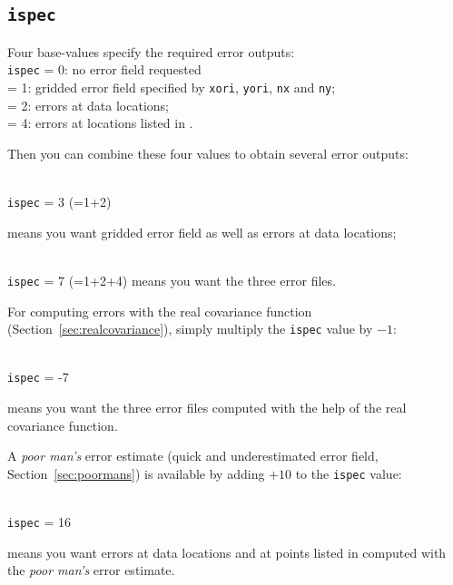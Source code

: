                       
\subsection{\texttt{ispec}}

Four base-values specify the required error outputs:\\

\texttt{ispec}       = 0\qquad: no error field requested\\
  = 1\qquad: gridded error field specified by \texttt{xori}, \texttt{yori}, \texttt{nx} and \texttt{ny}; \\
  = 2\qquad: errors at data locations;\\
  = 4\qquad: errors at locations listed in .

Then you can combine these four values to obtain several error outputs:

\examples\\
\texttt{ispec}             = 3 (=1+2)\hphantom{+4} \qquad \begin{minipage}[t]{.7\textwidth}means you want gridded error field as well as errors at data locations;\end{minipage}\\ 
\texttt{ispec}             = 7 (=1+2+4) \qquad means you want the three error files.


For computing errors with the real covariance function (Section~\ref{sec:realcovariance}), simply multiply the \texttt{ispec} value by $-1$:

\example\\
\texttt{ispec}             = -7 \qquad \begin{minipage}[t]{.7\textwidth}{means you want the three error files computed with the help of the real covariance function.}\end{minipage}


A \textit{poor man's} error estimate (quick and underestimated error field, Section~\ref{sec:poormans}) is available by adding $+10$ to the \texttt{ispec} value:

\example\\
\texttt{ispec}             = 16 \qquad \begin{minipage}[t]{.7\textwidth}{means you want errors at data locations and at points listed in  computed with the \textit{poor man's} error estimate.}\end{minipage}

